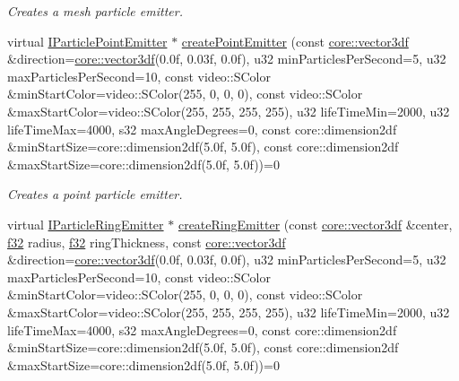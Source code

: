 \begin{DoxyCompactItemize}
\begin{DoxyCompactList}\small\item\em Creates a mesh particle emitter. \end{DoxyCompactList}\item 
virtual \hyperlink{classirr_1_1scene_1_1IParticleEmitter}{I\+Particle\+Point\+Emitter} $\ast$ \hyperlink{classirr_1_1scene_1_1IParticleSystemSceneNode_a99e2549ad185f0c23b73f43869c60ab8}{create\+Point\+Emitter} (const \hyperlink{namespaceirr_1_1core_ae6e2b2a6c552833ebbd5b7463d03586b}{core\+::vector3df} \&direction=\hyperlink{namespaceirr_1_1core_ae6e2b2a6c552833ebbd5b7463d03586b}{core\+::vector3df}(0.\+0f, 0.\+03f, 0.\+0f), u32 min\+Particles\+Per\+Second=5, u32 max\+Particles\+Per\+Second=10, const video\+::\+S\+Color \&min\+Start\+Color=video\+::\+S\+Color(255, 0, 0, 0), const video\+::\+S\+Color \&max\+Start\+Color=video\+::\+S\+Color(255, 255, 255, 255), u32 life\+Time\+Min=2000, u32 life\+Time\+Max=4000, s32 max\+Angle\+Degrees=0, const core\+::dimension2df \&min\+Start\+Size=core\+::dimension2df(5.\+0f, 5.\+0f), const core\+::dimension2df \&max\+Start\+Size=core\+::dimension2df(5.\+0f, 5.\+0f))=0
\begin{DoxyCompactList}\small\item\em Creates a point particle emitter. \end{DoxyCompactList}\item 
virtual \hyperlink{classirr_1_1scene_1_1IParticleRingEmitter}{I\+Particle\+Ring\+Emitter} $\ast$ \hyperlink{classirr_1_1scene_1_1IParticleSystemSceneNode_adee7e28b730ce82ae78e01ccccfff98e}{create\+Ring\+Emitter} (const \hyperlink{namespaceirr_1_1core_ae6e2b2a6c552833ebbd5b7463d03586b}{core\+::vector3df} \&center, \hyperlink{namespaceirr_a0277be98d67dc26ff93b1a6a1d086b07}{f32} radius, \hyperlink{namespaceirr_a0277be98d67dc26ff93b1a6a1d086b07}{f32} ring\+Thickness, const \hyperlink{namespaceirr_1_1core_ae6e2b2a6c552833ebbd5b7463d03586b}{core\+::vector3df} \&direction=\hyperlink{namespaceirr_1_1core_ae6e2b2a6c552833ebbd5b7463d03586b}{core\+::vector3df}(0.\+0f, 0.\+03f, 0.\+0f), u32 min\+Particles\+Per\+Second=5, u32 max\+Particles\+Per\+Second=10, const video\+::\+S\+Color \&min\+Start\+Color=video\+::\+S\+Color(255, 0, 0, 0), const video\+::\+S\+Color \&max\+Start\+Color=video\+::\+S\+Color(255, 255, 255, 255), u32 life\+Time\+Min=2000, u32 life\+Time\+Max=4000, s32 max\+Angle\+Degrees=0, const core\+::dimension2df \&min\+Start\+Size=core\+::dimension2df(5.\+0f, 5.\+0f), const core\+::dimension2df \&max\+Start\+Size=core\+::dimension2df(5.\+0f, 5.\+0f))=0

\end{DoxyCompactItemize}
